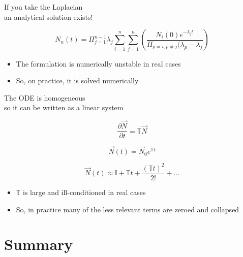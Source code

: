\documentclass{beamer}
\begin{document}
        \begin{frame}{If you take the Laplacian \\ an analytical solution exists!}

            \begin{equation*}
                N_n(t) = \Pi_{j=1}^{n-1} \lambda_j \sum_{i=1}^n \sum_{j=1}^n \left(\frac{N_i(0) e^{-\lambda_j t}}{\Pi_{p=i,p\ne j}(\lambda_p - \lambda_j}\right)
            \end{equation*}

            \begin{itemize}
                \pause
                \item The formulation is numerically unstable in real cases
                \pause
                \item So, on practice, it is solved numerically
            \end{itemize}
        \end{frame}

        \begin{frame}{The ODE is homogeneous \\ so it can be written as a linear system}

            \begin{equation*}
                \frac{\partial\vec N}{\partial t} = \mathbb{T} \vec N
            \end{equation*}

            \begin{equation*}
                \vec N(t) = \vec N_0 e^{\mathbb{T} t}
            \end{equation*}

            \begin{equation*}
                \vec N(t) \approx \mathbb{I} + \mathbb{T}t + \frac{\left(\mathbb{T}t\right)^2}{2!} + \dots
            \end{equation*}

            \begin{itemize}
                \pause
                \item $\mathbb{T}$ is large and ill-conditioned in real cases
                \pause
                \item So, in practice many of the less relevant terms are zeroed and collapsed
            \end{itemize}
        \end{frame}

\section*{Summary}
\end{document}
